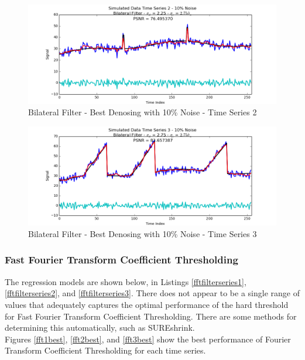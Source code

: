 \documentclass[11pt]{article}
\theoremstyle{definition}
\begin{document}
\begin{figure}
\centering
\includegraphics[width = 0.75 \textwidth]{BilateralSignal2Best.png}
\caption{Bilateral Filter - Best Denosing with 10\% Noise - Time Series 2}
\label{bilateral2best}
\end{figure}

\begin{figure}
\centering
\includegraphics[width = 0.75 \textwidth]{BilateralSignal3Best.png}
\caption{Bilateral Filter - Best Denosing with 10\% Noise - Time Series 3}
\label{bilateral3best}
\end{figure}

\newpage

\subsubsection{Fast Fourier Transform Coefficient Thresholding}

The regression models are shown below, in Listings \ref{fftfilterseries1}, \ref{fftfilterseries2}, and \ref{fftfilterseries3}. There does not appear to be a single range of values that adequately captures the optimal performance of the hard threshold for Fast Fourier Transform Coefficient Thresholding. There are some methods for determining this automatically, such as SUREshrink.\\

Figures \ref{fft1best}, \ref{fft2best}, and \ref{fft3best} show the best performance of Fourier Transform Coefficient Thresholding for each time series.
\end{document}
